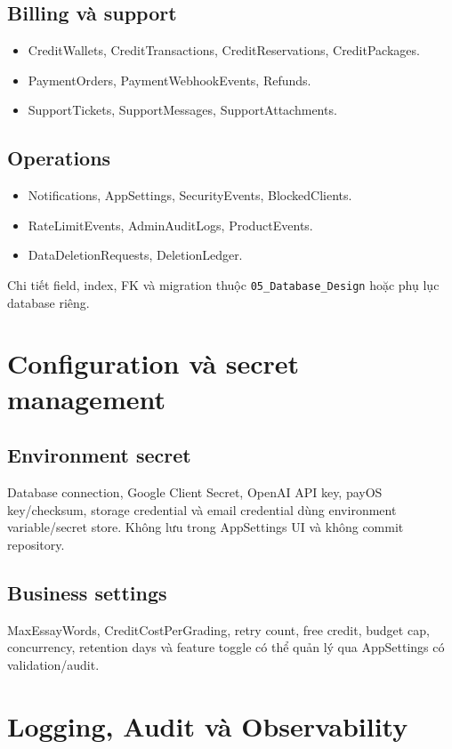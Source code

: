 \documentclass[11pt,a4paper]{article}
\begin{document}
\subsection{Billing và support}
\begin{itemize}
  \item CreditWallets, CreditTransactions, CreditReservations, CreditPackages.
  \item PaymentOrders, PaymentWebhookEvents, Refunds.
  \item SupportTickets, SupportMessages, SupportAttachments.
\end{itemize}

\subsection{Operations}
\begin{itemize}
  \item Notifications, AppSettings, SecurityEvents, BlockedClients.
  \item RateLimitEvents, AdminAuditLogs, ProductEvents.
  \item DataDeletionRequests, DeletionLedger.
\end{itemize}

Chi tiết field, index, FK và migration thuộc \texttt{05\_Database\_Design} hoặc phụ lục database riêng.

\section{Configuration và secret management}

\subsection{Environment secret}
Database connection, Google Client Secret, OpenAI API key, payOS key/checksum, storage credential và email credential dùng environment variable/secret store. Không lưu trong AppSettings UI và không commit repository.

\subsection{Business settings}
MaxEssayWords, CreditCostPerGrading, retry count, free credit, budget cap, concurrency, retention days và feature toggle có thể quản lý qua AppSettings có validation/audit.

\section{Logging, Audit và Observability}
\end{document}
